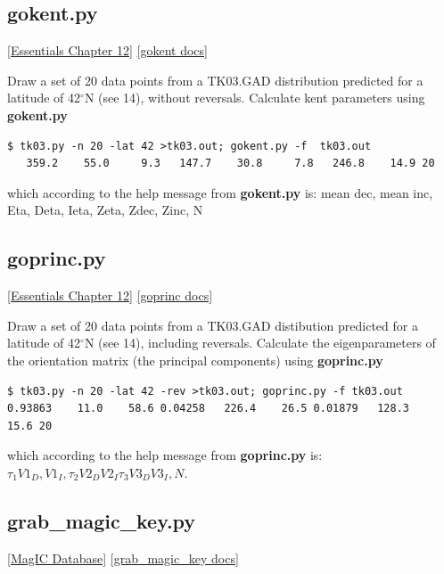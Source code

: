 \documentclass[11pt]{book}
\begin{document}
{{%

\subsection{gokent.py}
 \href{http://earthref.org/MAGIC/books/Tauxe/Essentials/WebBook3ch11.html#ch11}{[Essentials Chapter 12]}
 \href{https://github.com/PmagPy/PmagPy/blob/master/programs/gokent.py}{[gokent docs]}

Draw a set of 20 data points  from a TK03.GAD distribution predicted for a latitude of 42$^{\circ}$N (see  14), without  reversals.  Calculate kent parameters using {\bf gokent.py}

\begin{verbatim}
$ tk03.py -n 20 -lat 42 >tk03.out; gokent.py -f  tk03.out
   359.2    55.0     9.3   147.7    30.8     7.8   246.8    14.9 20
\end{verbatim}

\noindent  which according to the help message from {\bf gokent.py} is:   mean dec, mean inc, Eta, Deta, Ieta, Zeta, Zdec, Zinc, N

\subsection{goprinc.py}
 \href{http://earthref.org/MAGIC/books/Tauxe/Essentials/WebBook3ch11.html#ch11}{[Essentials Chapter 12]}
 \href{https://github.com/PmagPy/PmagPy/blob/master/programs/goprinc.py}{[goprinc docs]}

Draw a set of 20 data points  from a TK03.GAD distibution predicted for a latitude of 42$^{\circ}$N (see  14), including reversals.  Calculate the eigenparameters of the orientation matrix (the principal components)  using {\bf goprinc.py}

\begin{verbatim}
$ tk03.py -n 20 -lat 42 -rev >tk03.out; goprinc.py -f tk03.out
0.93863    11.0    58.6 0.04258   226.4    26.5 0.01879   128.3    15.6 20
\end{verbatim}

\noindent  which according to the help message from {\bf goprinc.py} is:    $\tau_1 V1_D, V1_I,  \tau_2 V2_D V2_I \tau_3 V3_D V3_I, N$.

\subsection{grab\_magic\_key.py}
\href{#MagICDatabase}{[MagIC Database]}
\href{https://github.com/PmagPy/PmagPy/blob/master/programs/grab_magic_key.py}{[grab\_magic\_key docs]}

}}
\end{document}
